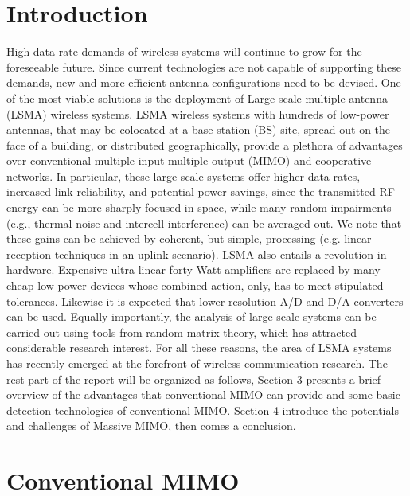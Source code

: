 \documentclass[conference]{IEEEtran}
\begin{document}
\section{Introduction}
High data rate demands of wireless systems will continue to grow for the foreseeable future. Since current technologies are not capable of supporting these demands, new and more efficient antenna configurations need to be devised. One of the most viable solutions is the deployment of Large-scale multiple antenna (LSMA) wireless systems. LSMA wireless systems with hundreds of low-power antennas, that may be colocated at a base station (BS) site, spread out on the face of a building, or distributed geographically, provide a plethora of advantages over conventional multiple-input multiple-output (MIMO) and cooperative networks. In particular, these large-scale systems offer higher data rates, increased link reliability, and potential power savings, since the transmitted RF energy can be more sharply focused in space, while many random impairments (e.g., thermal noise and intercell interference) can be averaged out. We note that these gains can be achieved by coherent, but simple, processing
(e.g. linear reception techniques in an uplink scenario). LSMA also entails a revolution in hardware. Expensive ultra-linear forty-Watt amplifiers are replaced by many cheap low-power
devices whose combined action, only, has to meet stipulated tolerances. Likewise it is expected that lower resolution A/D and D/A converters can be used. Equally importantly, the
analysis of large-scale systems can be carried out using tools from random matrix theory, which has attracted considerable research interest. For all these reasons, the area of LSMA
systems has recently emerged at the forefront of wireless communication research.\newline
The rest part of the report will be organized as follows, Section 3 presents a brief overview of the advantages that conventional MIMO can provide and some basic detection technologies of conventional MIMO. Section 4 introduce the potentials and challenges of Massive MIMO, then comes a conclusion.
\section{Conventional MIMO}
\end{document}
